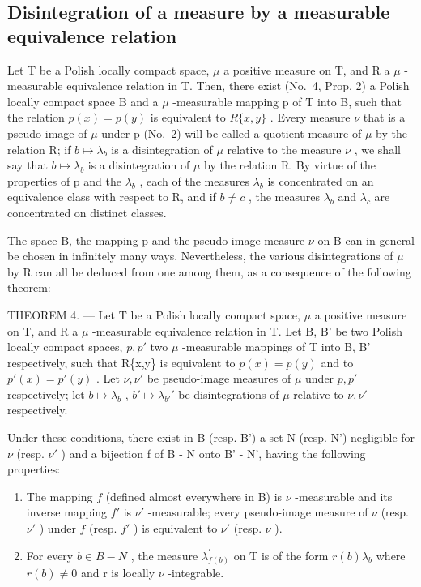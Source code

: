 \subsection{Disintegration of a measure by a measurable equivalence relation}

Let T be a Polish locally compact space, \(\mu\) a positive measure on T, and R a \(\mu\) -measurable equivalence relation in T. Then, there exist (No.~4, Prop. 2) a Polish locally compact space B and a \(\mu\) -measurable mapping p of T into B, such that the relation \(p(x) = p(y)\) is equivalent to \(R\{x, y\}\) . Every measure \(\nu\) that is a pseudo-image of \(\mu\) under p (No.~2) will be called a quotient measure of \(\mu\) by the relation R; if \(b \mapsto \lambda_b\) is a disintegration of \(\mu\) relative to the measure \(\nu\) , we shall say that \(b \mapsto \lambda_b\) is a disintegration of \(\mu\) by the relation R. By virtue of the properties of p and the \(\lambda_b\) , each of the measures \(\lambda_b\) is concentrated on an equivalence class with respect to R, and if \(b \neq c\) , the measures \(\lambda_b\) and \(\lambda_c\) are concentrated on distinct classes.

The space B, the mapping p and the pseudo-image measure \(\nu\) on B can in general be chosen in infinitely many ways. Nevertheless, the various disintegrations of \(\mu\) by R can all be deduced from one among them, as a consequence of the following theorem:

THEOREM 4. --- Let T be a Polish locally compact space, \(\mu\) a positive measure on T, and R a \(\mu\) -measurable equivalence relation in T. Let B, B' be two Polish locally compact spaces, \(p, p'\) two \(\mu\) -measurable mappings of T into B, B' respectively, such that R\{x,y\} is equivalent to \(p(x) = p(y)\) and to \(p'(x) = p'(y)\) . Let \(\nu, \nu'\) be pseudo-image measures of \(\mu\) under \(p, p'\) respectively; let \(b \mapsto \lambda_b\) , \(b' \mapsto \lambda_{b'}'\) be disintegrations of \(\mu\) relative to \(\nu, \nu'\) respectively.

Under these conditions, there exist in B (resp. B') a set N (resp. N') negligible for \(\nu\) (resp. \(\nu'\) ) and a bijection f of B - N onto B' - N', having the following properties:

\begin{enumerate}
\def\labelenumi{\alph{enumi})}
\item
  The mapping \(f\) (defined almost everywhere in B) is \(\nu\) -measurable and its inverse mapping \(f'\) is \(\nu'\) -measurable; every pseudo-image measure of \(\nu\) (resp. \(\nu'\) ) under \(f\) (resp. \(f'\) ) is equivalent to \(\nu'\) (resp. \(\nu\) ).
\item
  For every \(b \in B - N\) , the measure \(\lambda_{f(b)}^{\prime}\) on T is of the form \(r(b)\lambda_{b}\) where \(r(b) \neq 0\) and r is locally \(\nu\) -integrable.
\end{enumerate}

